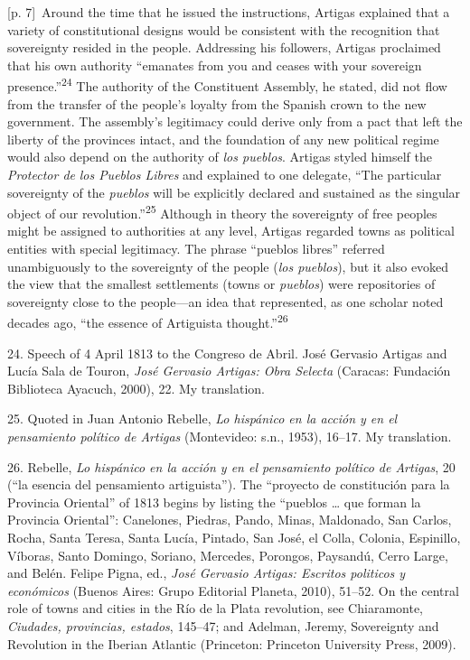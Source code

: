 \documentclass[10pt,a4paper]{article}
\begin{document}
{\scriptsize\color{gray} [p. 7]}\ Around the time that he issued the instructions, Artigas explained that a variety of constitutional designs would be consistent with the recognition that sovereignty resided in the people. Addressing his followers, Artigas proclaimed that his own authority “emanates from you and ceases with your sovereign presence.”\nobreak\textsuperscript{24} The authority of the Constituent Assembly, he stated, did not flow from the transfer of the people’s loyalty from the Spanish crown to the new government. The assembly’s legitimacy could derive only from a pact that left the liberty of the provinces intact, and the foundation of any new political regime would also depend on the authority of \textit{los pueblos}. Artigas styled himself the \textit{Protector de} \textit{los Pueblos Libres} and explained to one delegate, “The particular sovereignty of the \textit{pueblos} will be explicitly declared and sustained as the singular object of our revolution.”\nobreak\textsuperscript{25} Although in theory the sovereignty of free peoples might be assigned to authorities at any level, Artigas regarded towns as political entities with special legitimacy. The phrase “pueblos libres” referred unambiguously to the sovereignty of the people (\textit{los pueblos}), but it also evoked the view that the smallest settlements (towns or \textit{pueblos}) were repositories of sovereignty close to the people—an idea that represented, as one scholar noted decades ago, “the essence of Artiguista thought.”\nobreak\textsuperscript{26}\par{\small 24. Speech of 4 April 1813 to the Congreso de Abril. José Gervasio Artigas and Lucía Sala de Touron, \textit{José Gervasio Artigas: Obra Selecta} (Caracas: Fundación Biblioteca Ayacuch, 2000), 22. My translation.\par}{\small 25. Quoted in Juan Antonio Rebelle, \textit{Lo hispánico en la acción y en el pensamiento político de Artigas} (Montevideo: s.n., 1953), 16–17. My translation.\par}{\small 26. Rebelle, \textit{Lo hispánico en la acción y en el pensamiento político de Artigas}, 20 (“la esencia del pensamiento artiguista”). The “proyecto de constitución para la Provincia Oriental” of 1813 begins by listing the “pueblos … que forman la Provincia Oriental”: Canelones, Piedras, Pando, Minas, Maldonado, San Carlos, Rocha, Santa Teresa, Santa Lucía, Pintado, San José, el Colla, Colonia, Espinillo, Víboras, Santo Domingo, Soriano, Mercedes, Porongos, Paysandú, Cerro Large, and Belén. Felipe Pigna, ed., \textit{José Gervasio Artigas: Escritos politicos y económicos} (Buenos Aires: Grupo Editorial Planeta, 2010), 51–52. On the central role of towns and cities in the Río de la Plata revolution, see Chiaramonte, \textit{Ciudades, provincias, estados}, 145–47; and Adelman, Jeremy, Sovereignty and Revolution in the Iberian Atlantic (Princeton: Princeton University Press, 2009).\par}
\end{document}
